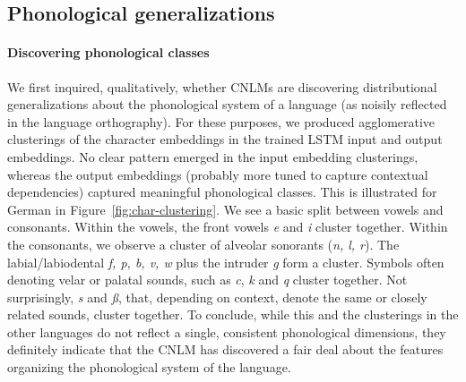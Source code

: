 
\subsection{Phonological generalizations}

\paragraph{Discovering phonological classes} We first inquired,
qualitatively, whether CNLMs are discovering distributional
generalizations about the phonological system of a language (as
noisily reflected in the language orthography). For these purposes, we
produced agglomerative clusterings of the character embeddings in the
trained LSTM  input and output embeddings. No clear pattern
emerged in the input embedding clusterings, whereas the output
embeddings (probably more tuned to capture contextual dependencies)
captured meaningful phonological classes. This is illustrated for
German in Figure~\ref{fig:char-clustering}. We see a basic split
between vowels and consonants. Within the vowels, the front vowels
\emph{e} and \emph{i} cluster together. Within the consonants, we
observe a cluster of alveolar sonorants (\emph{n, l, r}). The
labial/labiodental \emph{f, p, b, v, w} plus the intruder \emph{g}
form a cluster. Symbols often denoting velar or palatal sounds, such
as \emph{c}, \emph{k} and \emph{q} cluster together. Not surprisingly,
\emph{s} and \emph{{\ss}}, that, depending on context, denote the same
or closely related sounds, cluster together. To conclude, while this
and the clusterings in the other languages do not reflect a single,
consistent phonological dimensions, they definitely indicate that the
CNLM has discovered a fair deal about the features organizing the
phonological system of the language.



